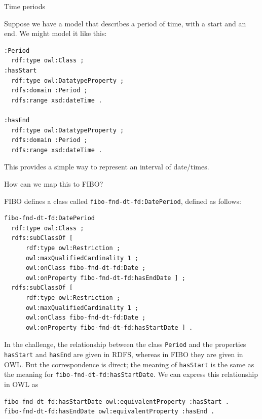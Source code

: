 \begin{challenge}{Time periods}

Suppose we have a model that describes a period of time, 
with a start and an end.  We might model it like this: 

\begin{lstlisting}
:Period
  rdf:type owl:Class ;
:hasStart
  rdf:type owl:DatatypeProperty ;
  rdfs:domain :Period ;
  rdfs:range xsd:dateTime .
 
:hasEnd
  rdf:type owl:DatatypeProperty ;
  rdfs:domain :Period ;
  rdfs:range xsd:dateTime .
\end{lstlisting}

This provides a simple way to represent an interval of date/times. 

How can we map this to FIBO? 

\solution

FIBO defines a class called \texttt{fibo-fnd-dt-fd:DatePeriod}, defined as follows:

\begin{lstlisting}
fibo-fnd-dt-fd:DatePeriod
  rdf:type owl:Class ;
  rdfs:subClassOf [
      rdf:type owl:Restriction ;
      owl:maxQualifiedCardinality 1 ;
      owl:onClass fibo-fnd-dt-fd:Date ;
      owl:onProperty fibo-fnd-dt-fd:hasEndDate ] ;
  rdfs:subClassOf [
      rdf:type owl:Restriction ;
      owl:maxQualifiedCardinality 1 ;
      owl:onClass fibo-fnd-dt-fd:Date ;
      owl:onProperty fibo-fnd-dt-fd:hasStartDate ] .
\end{lstlisting}

In the challenge, the relationship between the class \texttt{Period} 
and the properties \texttt{hasStart} and \texttt{hasEnd} are 
given in RDFS, whereas in FIBO they are given in OWL.  
But the correspondence is direct; the meaning of \texttt{hasStart} 
is the same as 
the meaning for \texttt{fibo-fnd-dt-fd:hasStartDate}.  We can 
express this relationship in OWL as 

\begin{lstlisting}
fibo-fnd-dt-fd:hasStartDate owl:equivalentProperty :hasStart .
fibo-fnd-dt-fd:hasEndDate owl:equivalentProperty :hasEnd .
\end{lstlisting}
\end{challenge}


